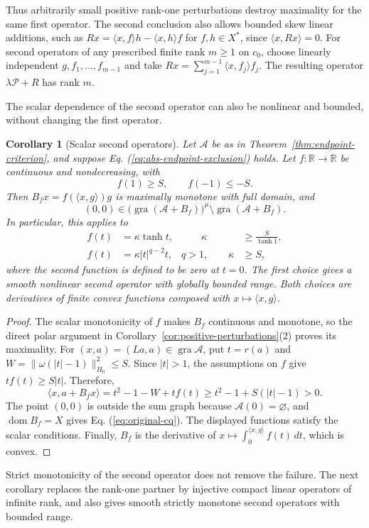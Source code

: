 \documentclass[11pt]{article}
\newcommand{\R}{\mathbb R}
\newcommand{\gra}{\operatorname{gra}}
\newcommand{\dom}{\operatorname{dom}}
\newcommand{\pair}[2]{\langle #1,#2\rangle}
\newtheorem{corollary}{Corollary}
\theoremstyle{definition}
\theoremstyle{remark}
\begin{document}
Thus arbitrarily small positive rank-one perturbations destroy maximality for the same first operator. The second conclusion also allows bounded skew linear additions, such as $Rx=\pair{x}{f}h-\pair{x}{h}f$ for $f,h\in X^*$, since $\pair{x}{Rx}=0$. For second operators of any prescribed finite rank $m\ge1$ on $c_0$, choose linearly independent $g,f_1,\ldots,f_{m-1}$ and take $Rx=\sum_{j=1}^{m-1}\pair{x}{f_j}f_j$. The resulting operator $\lambda\mathcal P+R$ has rank $m$.

The scalar dependence of the second operator can also be nonlinear and bounded, without changing the first operator.

\begin{corollary}[Scalar second operators]
\label{cor:scalar-partners}
Let $\mathcal A$ be as in Theorem~\ref{thm:endpoint-criterion}, and suppose Eq. (\ref{eq:abs-endpoint-exclusion}) holds. Let $f:\R\to\R$ be continuous and nondecreasing, with
\[
f(1)\ge S,\qquad f(-1)\le-S.
\]
Then $B_f x=f(\pair{x}{g})g$ is maximally monotone with full domain, and
\[
(0,0)\in\bigl(\gra(\mathcal A+B_f)\bigr)^\mu\setminus\gra(\mathcal A+B_f).
\]
In particular, this applies to
\[
\begin{aligned}
f(t)&=\kappa\tanh t,&\qquad \kappa&\ge\frac{S}{\tanh1},\\
f(t)&=\kappa|t|^{q-2}t,& q>1,\qquad \kappa&\ge S,
\end{aligned}
\]
where the second function is defined to be zero at $t=0$. The first choice gives a smooth nonlinear second operator with globally bounded range. Both choices are derivatives of finite convex functions composed with $x\mapsto\pair{x}{g}$.
\end{corollary}
\begin{proof}
The scalar monotonicity of $f$ makes $B_f$ continuous and monotone, so the direct polar argument in Corollary~\ref{cor:positive-perturbations}(2) proves its maximality. For $(x,a)=(La,a)\in\gra\mathcal A$, put $t=r(a)$ and $W=\|\omega(|t|-1)\|_{H_0}^2\le S$. Since $|t|>1$, the assumptions on $f$ give $tf(t)\ge S|t|$. Therefore,
\[
\pair{x}{a+B_fx}=t^2-1-W+tf(t)
\ge t^2-1+S(|t|-1)>0.
\]
The point $(0,0)$ is outside the sum graph because $\mathcal A(0)=\varnothing$, and $\dom B_f=X$ gives Eq. (\ref{eq:original-cq}). The displayed functions satisfy the scalar conditions. Finally, $B_f$ is the derivative of $x\mapsto\int_0^{\pair{x}{g}}f(t)\,dt$, which is convex.
\end{proof}

Strict monotonicity of the second operator does not remove the failure. The next corollary replaces the rank-one partner by injective compact linear operators of infinite rank, and also gives smooth strictly monotone second operators with bounded range.
\end{document}
